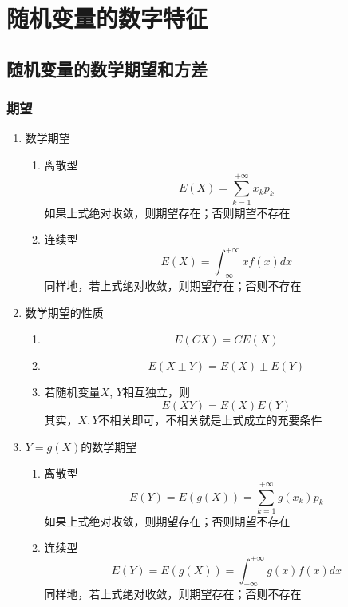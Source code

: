\section{随机变量的数字特征}
\subsection{随机变量的数学期望和方差}
\subsubsection{期望}
\begin{enumerate}
	\item 数学期望
	\begin{enumerate}
		\item 离散型
			\begin{equation}
				E(X) = \sum_{k=1}^{+\infty}x_kp_k
			\end{equation}
			如果上式绝对收敛，则期望存在；否则期望不存在
		\item 连续型
			\begin{equation}
				E(X) = \int_{-\infty}^{+\infty}xf(x)dx
			\end{equation}
			同样地，若上式绝对收敛，则期望存在；否则不存在
	\end{enumerate}

	\item 数学期望的性质
	\begin{enumerate}
		\item 
		\begin{equation}
			E(CX) = CE(X)
		\end{equation}
		\item 
		\begin{equation}
			E(X \pm Y) = E(X) \pm E(Y)
		\end{equation}
		\item 若随机变量$X$, $Y$相互独立，则
		\begin{equation}
			E(XY) = E(X)E(Y)
		\end{equation}
		其实，$X, Y$不相关即可，不相关就是上式成立的充要条件
	\end{enumerate}

	\item $Y=g(X)$的数学期望
	\begin{enumerate}
		\item 离散型
			\begin{equation}
				E(Y) = E\left(g(X)\right) = \sum_{k=1}^{+\infty} g(x_k)p_k
			\end{equation}
			如果上式绝对收敛，则期望存在；否则期望不存在
		\item 连续型
			\begin{equation}
				E(Y) = E(g(X)) = \int_{-\infty}^{+\infty}g(x)f(x)dx
			\end{equation}
			同样地，若上式绝对收敛，则期望存在；否则不存在
	\end{enumerate}


\end{enumerate}
